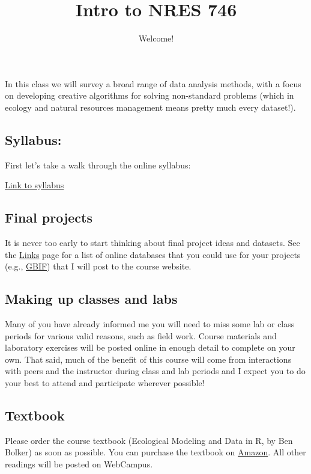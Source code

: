 \documentclass[
]{article}
\title{Intro to NRES 746}
\author{Welcome!}
\date{}
\begin{document}
\maketitle

In this class we will survey a broad range of data analysis methods,
with a focus on developing creative algorithms for solving non-standard
problems (which in ecology and natural resources management means pretty
much every dataset!).

\hypertarget{syllabus}{%
\subsection{Syllabus:}\label{syllabus}}

First let's take a walk through the online syllabus:

\href{index.html}{Link to syllabus}

\hypertarget{final-projects}{%
\subsection{Final projects}\label{final-projects}}

It is never too early to start thinking about final project ideas and
datasets. See the \href{Links.html}{Links} page for a list of online
databases that you could use for your projects (e.g.,
\href{gbif.org}{GBIF}) that I will post to the course website.

\hypertarget{making-up-classes-and-labs}{%
\subsection{Making up classes and
labs}\label{making-up-classes-and-labs}}

Many of you have already informed me you will need to miss some lab or
class periods for various valid reasons, such as field work. Course
materials and laboratory exercises will be posted online in enough
detail to complete on your own. That said, much of the benefit of this
course will come from interactions with peers and the instructor during
class and lab periods and I expect you to do your best to attend and
participate wherever possible!

\hypertarget{textbook}{%
\subsection{Textbook}\label{textbook}}

Please order the course textbook (Ecological Modeling and Data in R, by
Ben Bolker) as soon as possible. You can purchase the textbook on
\href{https://www.amazon.com/Ecological-Models-Data-Benjamin-Bolker/dp/0691125228}{Amazon}.
All other readings will be posted on WebCampus.
\end{document}
